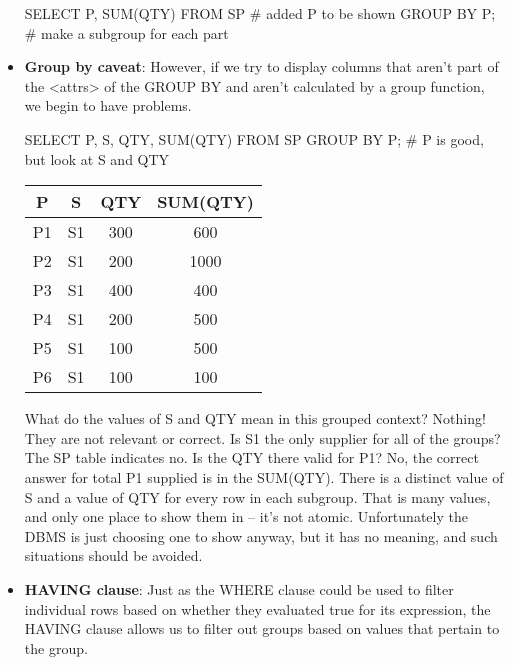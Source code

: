 \documentclass{report}
\begin{document}
\begin{itemize}
\begin{sqlcode}
            SELECT P, SUM(QTY) FROM SP # added P to be shown
                GROUP BY P; # make a subgroup for each part
            \end{sqlcode}
        \item \textbf{Group by caveat}: However, if we try to display columns that aren’t part of the <attrs> of the GROUP BY and aren’t calculated by a group function, we begin to have problems.
            \bigbreak \noindent 
            \begin{sqlcode}
            SELECT P, S, QTY, SUM(QTY) FROM SP GROUP BY P; # P is good, but look at S and QTY
            \end{sqlcode}
            \bigbreak \noindent 
            \begin{center}
                \begin{tabular}{c|c|c|c}
                    P &S &QTY &SUM(QTY) \\
                    \hline
                    P1 &S1 &300 &600 \\
                    P2 &S1 &200 &1000 \\
                    P3 &S1 &400 &400 \\
                    P4 &S1 &200 &500 \\
                    P5 &S1 &100 &500 \\
                    P6 &S1 &100 &100 
                \end{tabular}
            \end{center}
            \bigbreak \noindent 
            What do the values of S and QTY mean in this grouped context? Nothing! They are not relevant or correct. Is S1 the
            only supplier for all of the groups? The SP table indicates no. Is the QTY there valid for P1? No, the correct answer
            for total P1 supplied is in the SUM(QTY).
            \bigbreak \noindent 
            There is a distinct value of S and a value of QTY for every row in each subgroup. That is many values, and only one
            place to show them in – it’s not atomic. Unfortunately the DBMS is just choosing one to show anyway, but it has no
            meaning, and such situations should be avoided.
        \item \textbf{HAVING clause}: Just as the WHERE clause could be used to filter individual rows based on whether they evaluated true for its expression, the HAVING clause allows us to filter out groups based on values that pertain to the group.
            \bigbreak \noindent 
            \begin{sqlcode}

\end{sqlcode}
\end{itemize}
\end{document}
